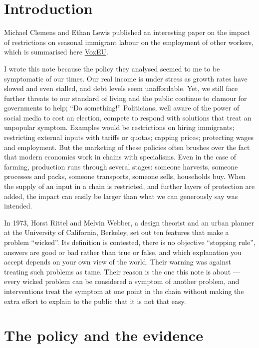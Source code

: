 \documentclass[11pt,a4paper]{article}
\begin{document}
\section{Introduction}
\label{sec:intro}

Michael Clemens and Ethan Lewis published an interesting paper on the impact of restrictions on seasonal immigrant labour on the employment of other workers, which is summarised here \href{https://cepr.org/voxeu/columns/restricting-hiring-low-skill-immigrants-hurts-firms-and-does-not-benefit-native-born}{VoxEU}.

I wrote this note because the policy they analysed seemed to me to be symptomatic of our times. Our real income is under stress as growth rates have slowed and even stalled, and debt levels seem unaffordable. Yet, we still face further threats to our standard of living and the public continue to clamour for governments to help; ``Do something!'' Politicians, well aware of the power of social media to cost an election, compete to respond with solutions that treat an unpopular symptom. Examples would be restrictions on hiring immigrants; restricting external inputs with tariffs or quotas; capping prices; protecting wages and employment. But the marketing of these policies often brushes over the fact that modern economies work in chains with specialisms. Even in the case of farming, production runs through several stages: someone harvests, someone processes and packs, someone transports, someone sells, households buy. When the supply of an input in a chain is restricted, and further layers of protection are added, the impact can easily be larger than what we can generously say was intended.

In 1973, Horst Rittel and Melvin Webber, a design theorist and an urban planner at the University of California, Berkeley, set out ten features that make a problem ``wicked''. Its definition is contested, there is no objective ``stopping rule'', answers are good or bad rather than true or false, and which explanation you accept depends on your own view of the world. Their warning was against treating such problems as tame. Their reason is the one this note is about — every wicked problem can be considered a symptom of another problem, and interventions treat the symptom at one point in the chain without making the extra effort to explain to the public that it is not that easy.

\section{The policy and the evidence}
\label{sec:study}
\end{document}
